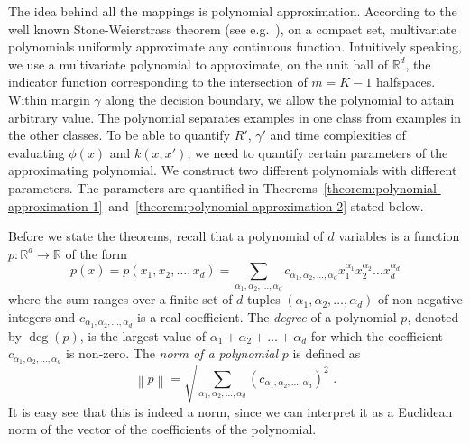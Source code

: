 \documentclass[12pt]{article}
\newcommand{\R}{\mathbb{R}}  %
\newcommand{\norm}[1]{\left\| #1 \right\|}  %
\begin{document}
The idea behind all the mappings is polynomial approximation. According to the
well known Stone-Weierstrass theorem (see
e.g.~\citep[Section~10.10]{Davidson-Donsig-2010}), on a compact set,
multivariate polynomials uniformly approximate any continuous function.
Intuitively speaking, we use a multivariate polynomial to approximate, on the
unit ball of $\R^d$, the indicator function corresponding to the intersection of
$m=K-1$ halfspaces. Within margin $\gamma$ along the decision boundary, we allow
the polynomial to attain arbitrary value. The polynomial separates examples in
one class from examples in the other classes. To be able to quantify $R'$,
$\gamma'$ and time complexities of evaluating $\phi(x)$ and $k(x,x')$, we need
to quantify certain parameters of the approximating polynomial. We construct two
different polynomials with different parameters. The parameters are quantified
in
Theorems~\ref{theorem:polynomial-approximation-1}~and~\ref{theorem:polynomial-approximation-2}
stated below.

Before we state the theorems, recall that a polynomial of $d$ variables is a
function $p:\R^d \to \R$ of the form
$$
p(x) = p(x_1, x_2, \dots, x_d) = \sum_{\alpha_1, \alpha_2, \dots, \alpha_d} c_{\alpha_1, \alpha_2, \dots, \alpha_d} x_1^{\alpha_1} x_2^{\alpha_2} \dots x_d^{\alpha_d}
$$
where the sum ranges over a finite set of $d$-tuples $(\alpha_1, \alpha_2,
\dots, \alpha_d)$ of non-negative integers and $c_{\alpha_1, \alpha_2, \dots,
\alpha_d}$ is a real coefficient. The \emph{degree} of a polynomial $p$, denoted
by $\deg(p)$, is the largest value of $\alpha_1 + \alpha_2 + \dots + \alpha_d$
for which the coefficient $c_{\alpha_1, \alpha_2, \dots, \alpha_d}$ is non-zero.
The \emph{norm of a polynomial} $p$ is defined as
$$
\norm{p} = \sqrt{\sum_{\alpha_1, \alpha_2, \dots, \alpha_d} \left(c_{\alpha_1, \alpha_2, \dots, \alpha_d} \right)^2 } \; .
$$
It is easy see that this is indeed a norm, since we can interpret it as a
Euclidean norm of the vector of the coefficients of the polynomial.
\end{document}
